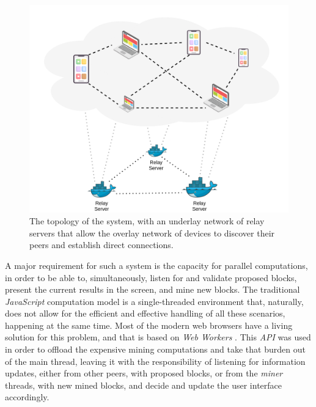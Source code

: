 \documentclass[journal]{IEEEtran}
\begin{document}
\begin{figure}[h]
  \centering
  \includegraphics[width=\columnwidth]{in-browser-pow-topology}
  \caption{The topology of the system, with an underlay network of relay servers that allow the overlay network of devices to discover their peers and establish direct connections.}
  \label{fig:in-browser-pow-topology}
\end{figure}

A major requirement for such a system is the capacity for parallel computations, 
in order to be able to, simultaneously, listen for and validate proposed blocks, 
present the current results in the screen, and mine new blocks. The traditional 
\emph{JavaScript} computation model is a single-threaded environment that, naturally,
does not allow for the efficient and effective handling of all these scenarios, happening
at the same time. Most of the modern web browsers have a living solution for this problem, 
and that is based on \emph{Web Workers} \cite{webworkers}. This \emph{API} was used in order to offload
the expensive mining computations and take that burden out of the main thread, leaving it
with the responsibility of listening for information updates, either from other peers, with
proposed blocks, or from the \emph{miner} threads, with new mined blocks, and decide and update
the user interface accordingly.
\end{document}
